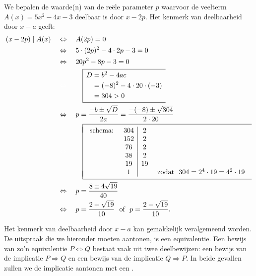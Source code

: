 \documentclass{ximera}
\begin{document}
\begin{example}
We bepalen de waarde(n) van de re\"ele parameter $p$ waarvoor de veelterm $A(x) = 5x^2-4x-3$ deelbaar is door $x-2p$. Het kenmerk van deelbaarheid door $x-a$ geeft:
\begin{align*}
(x-2p) \mid A(x) \quad 
& \Leftrightarrow \quad A(2p) = 0 \\
& \Leftrightarrow \quad 5 \cdot (2p)^2 - 4 \cdot 2p - 3 = 0 \\
& \Leftrightarrow \quad 20p^2 - 8p - 3 = 0 \\
& \mph{\Leftrightarrow} \qquad 
\begin{array}{|l}
\hline
\begin{aligned}
\vrule height 0.4cm width 0cm
D & = b^2-4ac \\[0.1cm]
& = (-8)^2-4 \cdot 20 \cdot (-3) \\[0.1cm]
& = 304 > 0 \\[0.1cm]
\end{aligned} \\
\hline
\end{array} \\
& \Leftrightarrow \quad p = \frac{-b \pm \sqrt{D}}{2a} = \frac{-(-8) \pm \sqrt{304}}{2 \cdot 20} \\
& \mph{\Leftrightarrow} \qquad 
\begin{array}{|l}
\hline
\mbox{} \\[-0.3cm]
\begin{array}{lc|cr}
\text{schema: } & 304 & 2 \\
& 152 & 2 \\
& 76 & 2 \\
& 38 & 2 \\
& 19 & 19 \\
& 1 & & \text{ zodat } \,\, 304 = 2^4 \cdot 19 = 4^2 \cdot 19
\end{array}\\[-0.3cm]
\mbox{} \\
\hline
\end{array} \\
& \Leftrightarrow \quad p = \frac{8 \pm 4\sqrt{19}}{40} \\
& \Leftrightarrow \quad p = \frac{2 + \sqrt{19}}{10} \,\, \text{ of } \,\, p = \frac{2 - \sqrt{19}}{10}.
\end{align*}
\end{example}

Het kenmerk van deelbaarheid door $x-a$ kan gemakkelijk veralgemeend worden. De uitspraak die we hieronder moeten aantonen, is een equivalentie. Een bewijs van zo'n equivalentie $P \Leftrightarrow Q$ bestaat vaak uit twee deelbewijzen: een bewijs van de implicatie $P \Rightarrow Q$ en een bewijs van de implicatie $Q \Rightarrow P$. In beide gevallen zullen we de implicatie aantonen met een .
\end{document}
